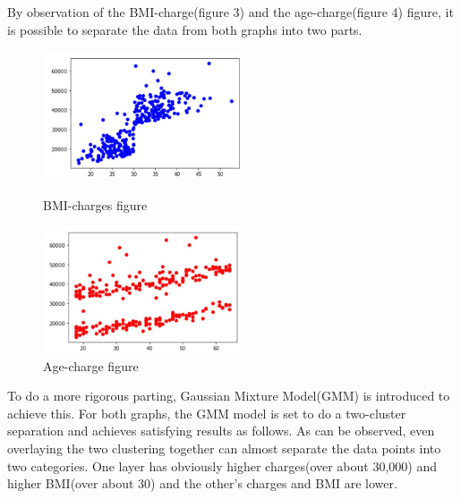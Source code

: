 \documentclass[12pt,a4paper]{article}
\begin{document}
By observation of the BMI-charge(figure 3) and the age-charge(figure 4) figure, it is possible to separate the data from both graphs into two parts. 

\begin{figure}[H]
\centering
\begin{minipage}[t]{0.48\textwidth}
\centering
\includegraphics[width=6cm]{bmi-charge smoker.jpg}
\caption{BMI-charges figure}
\end{minipage}
\begin{minipage}[t]{0.48\textwidth}
\centering
\includegraphics[width=6cm]{age-chargesmoker.jpg}
\caption{Age-charge figure}
\end{minipage}
\end{figure}


To do a more rigorous parting, Gaussian Mixture Model(GMM) is introduced to achieve this. For both graphs, the GMM model is set to do a two-cluster separation and achieves satisfying results as follows. As can be observed, even overlaying the two clustering together can almost separate the data points into two categories. One layer has obviously higher charges(over about 30,000) and higher BMI(over about 30) and the other's charges and BMI are lower.
\end{document}
